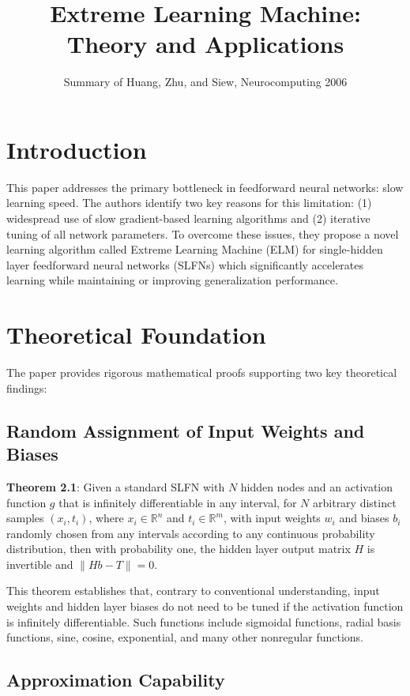 \documentclass[11pt]{article}
\title{Extreme Learning Machine: Theory and Applications}
\author{Summary of Huang, Zhu, and Siew, Neurocomputing 2006}
\date{}
\begin{document}
\maketitle

\section{Introduction}

This paper addresses the primary bottleneck in feedforward neural networks: slow learning speed. The authors identify two key reasons for this limitation: (1) widespread use of slow gradient-based learning algorithms and (2) iterative tuning of all network parameters. To overcome these issues, they propose a novel learning algorithm called Extreme Learning Machine (ELM) for single-hidden layer feedforward neural networks (SLFNs) which significantly accelerates learning while maintaining or improving generalization performance.

\section{Theoretical Foundation}

The paper provides rigorous mathematical proofs supporting two key theoretical findings:

\subsection{Random Assignment of Input Weights and Biases}

\textbf{Theorem 2.1}: Given a standard SLFN with $N$ hidden nodes and an activation function $g$ that is infinitely differentiable in any interval, for $N$ arbitrary distinct samples $(x_i, t_i)$, where $x_i \in \mathbb{R}^n$ and $t_i \in \mathbb{R}^m$, with input weights $w_i$ and biases $b_i$ randomly chosen from any intervals according to any continuous probability distribution, then with probability one, the hidden layer output matrix $H$ is invertible and $\|Hb - T\| = 0$.

This theorem establishes that, contrary to conventional understanding, input weights and hidden layer biases do not need to be tuned if the activation function is infinitely differentiable. Such functions include sigmoidal functions, radial basis functions, sine, cosine, exponential, and many other nonregular functions.

\subsection{Approximation Capability}
\end{document}
